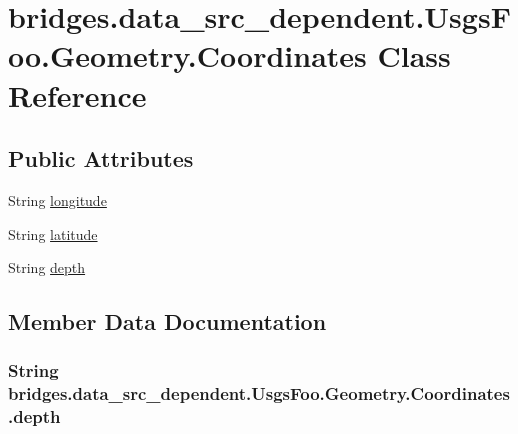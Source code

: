 \hypertarget{classbridges_1_1data__src__dependent_1_1_usgs_foo_1_1_geometry_1_1_coordinates}{}\section{bridges.\+data\+\_\+src\+\_\+dependent.\+Usgs\+Foo.\+Geometry.\+Coordinates Class Reference}
\label{classbridges_1_1data__src__dependent_1_1_usgs_foo_1_1_geometry_1_1_coordinates}
\subsection*{Public Attributes}
\begin{DoxyCompactItemize}
\item 
String \hyperlink{classbridges_1_1data__src__dependent_1_1_usgs_foo_1_1_geometry_1_1_coordinates_a45f2a0dc4220eb4a1e8ec576101f9633}{longitude}
\item 
String \hyperlink{classbridges_1_1data__src__dependent_1_1_usgs_foo_1_1_geometry_1_1_coordinates_a8ab648886a19cd5d07f330e1558b8175}{latitude}
\item 
String \hyperlink{classbridges_1_1data__src__dependent_1_1_usgs_foo_1_1_geometry_1_1_coordinates_aa566d321ac49828fffd447821bd4e72d}{depth}
\end{DoxyCompactItemize}


\subsection{Member Data Documentation}
\hypertarget{classbridges_1_1data__src__dependent_1_1_usgs_foo_1_1_geometry_1_1_coordinates_aa566d321ac49828fffd447821bd4e72d}{}
\subsubsection[{depth}]{\setlength{\rightskip}{0pt plus 5cm}String bridges.\+data\+\_\+src\+\_\+dependent.\+Usgs\+Foo.\+Geometry.\+Coordinates.\+depth}\label{classbridges_1_1data__src__dependent_1_1_usgs_foo_1_1_geometry_1_1_coordinates_aa566d321ac49828fffd447821bd4e72d}
\hypertarget{classbridges_1_1data__src__dependent_1_1_usgs_foo_1_1_geometry_1_1_coordinates_a8ab648886a19cd5d07f330e1558b8175}{}
